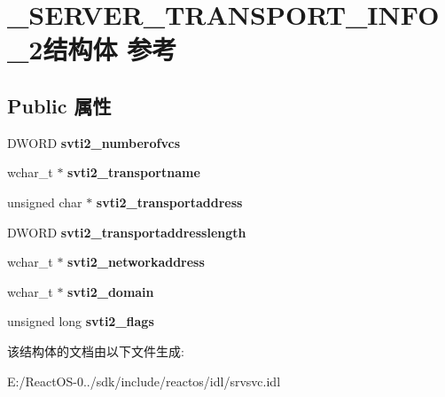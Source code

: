 \hypertarget{struct___s_e_r_v_e_r___t_r_a_n_s_p_o_r_t___i_n_f_o__2}{}\section{\+\_\+\+S\+E\+R\+V\+E\+R\+\_\+\+T\+R\+A\+N\+S\+P\+O\+R\+T\+\_\+\+I\+N\+F\+O\+\_\+2结构体 参考}
\label{struct___s_e_r_v_e_r___t_r_a_n_s_p_o_r_t___i_n_f_o__2}
\subsection*{Public 属性}
\begin{DoxyCompactItemize}
\item 
\mbox{\label{struct___s_e_r_v_e_r___t_r_a_n_s_p_o_r_t___i_n_f_o__2_a88a5105ed4c27c75f2f6bd6ba3662746}} 
D\+W\+O\+RD {\bfseries svti2\+\_\+numberofvcs}
\item 
\mbox{\label{struct___s_e_r_v_e_r___t_r_a_n_s_p_o_r_t___i_n_f_o__2_a9e29ee2aa6502320b809cc3cf56938cc}} 
wchar\+\_\+t $\ast$ {\bfseries svti2\+\_\+transportname}
\item 
\mbox{\label{struct___s_e_r_v_e_r___t_r_a_n_s_p_o_r_t___i_n_f_o__2_a7a669807886e89e32b83d15f767b0d7f}} 
unsigned char $\ast$ {\bfseries svti2\+\_\+transportaddress}
\item 
\mbox{\label{struct___s_e_r_v_e_r___t_r_a_n_s_p_o_r_t___i_n_f_o__2_a24e1240718d156db0f38a93c62f2662f}} 
D\+W\+O\+RD {\bfseries svti2\+\_\+transportaddresslength}
\item 
\mbox{\label{struct___s_e_r_v_e_r___t_r_a_n_s_p_o_r_t___i_n_f_o__2_a9acd11d5dfa0b335cce6e128f4236a69}} 
wchar\+\_\+t $\ast$ {\bfseries svti2\+\_\+networkaddress}
\item 
\mbox{\label{struct___s_e_r_v_e_r___t_r_a_n_s_p_o_r_t___i_n_f_o__2_ad153d280dc98e6fb5650b2ead738268d}} 
wchar\+\_\+t $\ast$ {\bfseries svti2\+\_\+domain}
\item 
\mbox{\label{struct___s_e_r_v_e_r___t_r_a_n_s_p_o_r_t___i_n_f_o__2_a7b91624cbbd46ab703779b9fd229adbb}} 
unsigned long {\bfseries svti2\+\_\+flags}
\end{DoxyCompactItemize}


该结构体的文档由以下文件生成\+:\begin{DoxyCompactItemize}
\item 
E\+:/\+React\+O\+S-\/0../sdk/include/reactos/idl/srvsvc.\+idl\end{DoxyCompactItemize}

